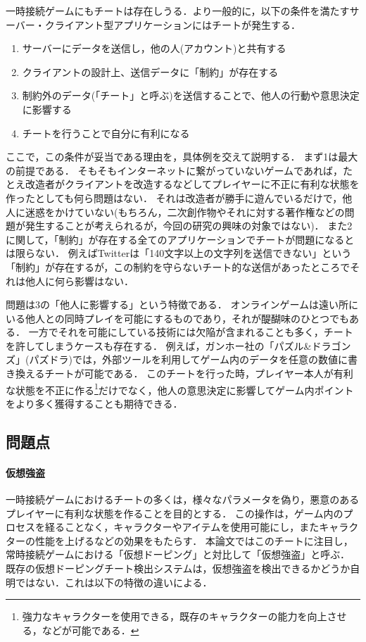 \documentclass[a4paper,11pt]{jsarticle}
\begin{document}
一時接続ゲームにもチートは存在しうる．より一般的に，以下の条件を満たすサーバー・クライアント型アプリケーションにはチートが発生する．

\begin{enumerate}
\item
サーバーにデータを送信し，他の人(アカウント)と共有する
\item
クライアントの設計上、送信データに「制約」が存在する
\item
制約外のデータ(「チート」と呼ぶ)を送信することで、他人の行動や意思決定に影響する
\item
チートを行うことで自分に有利になる
\end{enumerate}

ここで，この条件が妥当である理由を，具体例を交えて説明する．
まず1は最大の前提である．
そもそもインターネットに繋がっていないゲームであれば，たとえ改造者がクライアントを改造するなどしてプレイヤーに不正に有利な状態を作ったとしても何ら問題はない．
それは改造者が勝手に遊んでいるだけで，他人に迷惑をかけていない(もちろん，二次創作物やそれに対する著作権などの問題が発生することが考えられるが，今回の研究の興味の対象ではない)．
また2に関して，「制約」が存在する全てのアプリケーションでチートが問題になるとは限らない．
例えばTwitterは「140文字以上の文字列を送信できない」という「制約」が存在するが，この制約を守らないチート的な送信があったところでそれは他人に何ら影響はない．

問題は3の「他人に影響する」という特徴である．
オンラインゲームは遠い所にいる他人との同時プレイを可能にするものであり，それが醍醐味のひとつでもある．
一方でそれを可能にしている技術には欠陥が含まれることも多く，チートを許してしまうケースも存在する．
例えば，ガンホー社の「パズル\&ドラゴンズ」(パズドラ)では，外部ツール\cite{ghostrouter}を利用してゲーム内のデータを任意の数値に書き換えるチートが可能である．
このチートを行った時，プレイヤー本人が有利な状態を不正に作る\footnote{強力なキャラクターを使用できる，既存のキャラクターの能力を向上させる，などが可能である．}だけでなく，他人の意思決定に影響してゲーム内ポイントをより多く獲得することも期待できる．

\subsection{問題点}
\paragraph{仮想強盗}
一時接続ゲームにおけるチートの多くは，様々なパラメータを偽り，悪意のあるプレイヤーに有利な状態を作ることを目的とする．
この操作は，ゲーム内のプロセスを経ることなく，キャラクターやアイテムを使用可能にし，またキャラクターの性能を上げるなどの効果をもたらす．
本論文ではこのチートに注目し，常時接続ゲームにおける「仮想ドーピング」と対比して「仮想強盗」と呼ぶ．
既存の仮想ドーピングチート検出システムは，仮想強盗を検出できるかどうか自明ではない．これは以下の特徴の違いによる．
\end{document}
